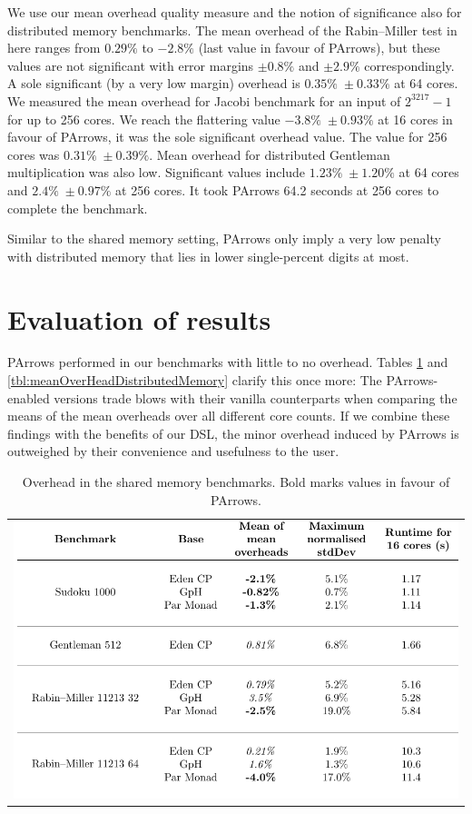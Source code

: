 \documentclass[paper=A4,twoside=true,openright,parskip=full,chapterprefix=true,headings=normal,bibliography=totoc,listof=totoc,titlepage=on,captions=tableabove,draft=false,british]{scrreprt}%
\begin{document}
We use our mean overhead quality measure and the notion of significance
also for distributed memory benchmarks. The mean overhead of the
Rabin--Miller test in here ranges from \(0.29\%\) to \(-2.8\%\) (last
value in favour of PArrows), but these values are not significant with
error margins \(\pm 0.8\%\) and \(\pm 2.9\%\) correspondingly. A sole
significant (by a very low margin) overhead is \(0.35\% \; \pm 0.33\%\)
at 64 cores. We measured the mean overhead for Jacobi benchmark for an
input of \(2^{3217}-1\) for up to 256 cores. We reach the flattering
value \(-3.8\% \; \pm 0.93\%\) at 16 cores in favour of PArrows, it was
the sole significant overhead value. The value for 256 cores was
\(0.31\% \; \pm 0.39\%\). Mean overhead for distributed Gentleman
multiplication was also low. Significant values include
\(1.23\% \; \pm 1.20\%\) at 64 cores and \(2.4\% \; \pm 0.97\%\) at 256
cores. It took PArrows 64.2 seconds at 256 cores to complete the
benchmark.

Similar to the shared memory setting, PArrows only imply a very low
penalty with distributed memory that lies in lower single-percent digits
at most.

\newpage

\hypertarget{evaluation-of-results}{%
\section{Evaluation of results}\label{evaluation-of-results}}

\label{sec:benchmarksEvaluation}

PArrows performed in our benchmarks with little to no overhead. Tables
\ref{tbl:meanOverheadSharedMemory} and
\ref{tbl:meanOverHeadDistributedMemory} clarify this once more: The
PArrows-enabled versions trade blows with their vanilla counterparts
when comparing the means of the mean overheads over all different core
counts. If we combine these findings with the benefits of our DSL, the
minor overhead induced by PArrows is outweighed by their convenience and
usefulness to the user.

\begin{longtable}[]{@{}l@{}}
\caption[Overhead in the shared memory benchmarks.]{Overhead in the shared memory benchmarks. Bold marks values in
favour of PArrows. \label{tbl:meanOverheadSharedMemory}}\tabularnewline
\includegraphics{src/img/bestAndWorstBenchmarks1.pdf}\tabularnewline
\end{longtable}
\end{document}
